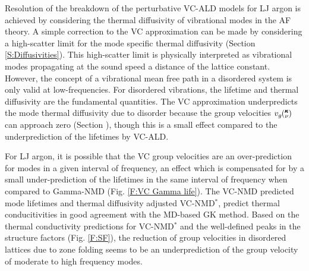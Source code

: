 \documentclass[aps,prb,onecolumn,preprint,superscriptaddress,amsmath,amssymb,floatfix]{revtex4}
\newcommand{\kv}{\mspace{-4.0mu}\left(\mspace{-8.0mu}
\begin{smallmatrix}&\pmb{\kappa} \\&\nu\end{smallmatrix}
\mspace{-3.0mu}\right)}
\begin{document}
Resolution 
of the breakdown of the perturbative VC-ALD models for LJ argon 
is achieved by considering the thermal diffusivity of vibrational 
modes in the AF theory. 
A simple correction to the VC approximation can be made by considering 
a high-scatter limit for the mode specific thermal 
diffusivity (Section \ref{S:Diffusivities}). 
This high-scatter limit is physically interpreted as vibrational modes 
propagating at the sound speed a distance of the lattice constant. 
However, the concept of a vibrational mean free path 
in a disordered system is only valid at low-frequencies.
\cite{feldman_numerical_1999,xu_energy_2009} For 
disordered vibrations, the lifetime and thermal diffusivity are the 
fundamental quantities. The VC approximation underpredicts 
the mode thermal 
diffusivity due to disorder because the group velocities $v_g\kv$ can 
approach zero (Section ), though this is a small effect compared to 
the underprediction of the lifetimes by VC-ALD. 

For LJ argon, it is possible that the VC group velocities are an 
over-prediction for modes in a given interval of frequency, 
an effect which is compensated for 
by a small under-prediction of the lifetimes in the same interval of 
frequency when compared to Gamma-NMD (Fig. \ref{F:VC Gamma life}). 
The VC-NMD predicted 
mode lifetimes and thermal diffusivity adjusted VC-NMD$^*$, 
predict thermal conducitivities in good agreement with 
the MD-based GK method. 
Based on the thermal conductivity predictions for VC-NMD$^*$ and 
the well-defined peaks in the structure factors 
(Fig. \ref{F:SF}), the reduction of group velocities in 
disordered lattices 
due to zone folding seems to be an underprediction of the group 
velocity of moderate to high frequency modes.\cite{duda_reducing_2011}  


\end{document}
